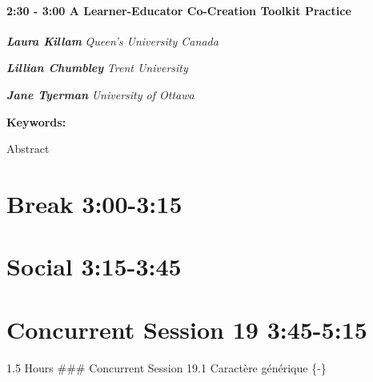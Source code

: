 \documentclass[
]{book}
\begin{document}
\begin{session}
\hypertarget{a-learner-educator-co-creation-toolkit-practice}{%
\paragraph*{\texorpdfstring{2:30 - 3:00 \textbar{} \textbf{A
Learner-Educator Co-Creation Toolkit} \textbar{}
Practice}{2:30 - 3:00 \textbar{} A Learner-Educator Co-Creation Toolkit \textbar{} Practice}}\label{a-learner-educator-co-creation-toolkit-practice}}

\textbf{\emph{Laura Killam}} \textbar{} \emph{Queen's University Canada}

\textbf{\emph{Lillian Chumbley}} \textbar{} \emph{Trent University }

\textbf{\emph{Jane Tyerman}} \textbar{} \emph{University of Ottawa}

\textbf{Keywords:}

Abstract
\end{session}

\hypertarget{break-300-315-1}{%
\section*{Break \textbar{} 3:00-3:15}\label{break-300-315-1}}

\hypertarget{social-315-345-1}{%
\section*{Social \textbar{} 3:15-3:45}\label{social-315-345-1}}

\hypertarget{concurrent-session-19-345-515}{%
\section*{Concurrent Session 19 \textbar{} 3:45-5:15}\label{concurrent-session-19-345-515}}

1.5 Hours
\#\#\# Concurrent Session 19.1 \textbar{} Caractère générique \{-\}
\end{document}

